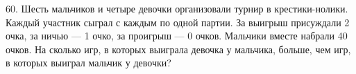 60. Шесть мальчиков и четыре девочки организовали турнир в крестики-нолики. Каждый участник сыграл с каждым по одной партии. За выигрыш присуждали 2 очка, за ничью --- 1 очко, за проигрыш --- 0 очков. Мальчики вместе набрали 40 очков. На сколько игр, в которых выиграла девочка у мальчика, больше, чем игр, в которых выиграл мальчик у девочки?\\
